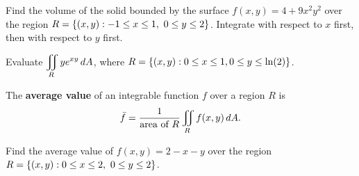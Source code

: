 \documentclass[../mathNotesPreamble]{subfiles}
\begin{document}
  \begin{ex*}
    Find the volume of the solid bounded by the surface $f(x,y)=4+9x^2y^2$ over the region $R={\left\{(x,y): -1\leq x\leq 1,\ 0\leq y\leq 2\right\}}$. Integrate with respect to $x$ first, then with respect to $y$ first.
  \end{ex*}
  \pagebreak

  \begin{ex*}
    Evaluate $\displaystyle\iint\limits_R ye^{xy}\,dA$, where $R={\left\{(x,y): 0\leq x\leq 1, 0\leq y\leq \ln(2)\right\}}$.
  \end{ex*}
  \pagebreak

  \begin{defn*}
    The \textbf{average value} of an integrable function $f$ over a region $R$ is
      \[\bar{f}=\frac{1}{\textnormal{area of }R}\iint\limits_R f(x,y)\,dA.\]
  \end{defn*}

  \begin{ex*}
    Find the average value of $f(x,y)=2-x-y$ over the region \newline $R=\set{(x,y): 0\leq x\leq 2,\ 0\leq y\leq 2}$.
  \end{ex*}

  \pagebreak
\end{document}
